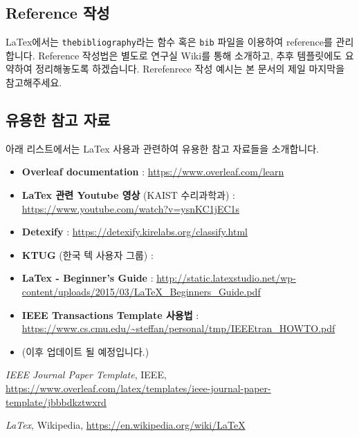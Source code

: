 \documentclass[journal]{IEEEtran}
\begin{document}
	\subsection{Reference 작성}
	
	LaTex에서는 {\tt thebibliography}라는 함수 혹은 {\tt bib} 파일을 이용하여 reference를 관리합니다. 
	Reference 작성법은 별도로 연구실 Wiki를 통해 소개하고, 추후 템플릿에도 요약하여 정리해놓도록 하겠습니다. 
	Rerefenrece 작성 예시는 본 문서의 제일 마지막을 참고해주세요. 
	
	\subsection{유용한 참고 자료}
	
	아래 리스트에서는 LaTex 사용과 관련하여 유용한 참고 자료들을 소개합니다. 
	\begin{itemize}
		\item {\bf Overleaf documentation} : \url{https://www.overleaf.com/learn}
		\item {\bf LaTex 관련 Youtube 영상} (KAIST 수리과학과) : {\url{https://www.youtube.com/watch?v=ysnKC1jEC1s}}
		\item {\bf Detexify} : \url{https://detexify.kirelabs.org/classify.html}
		\item {\bf KTUG} (한국 텍 사용자 그룹) : 
		\item {\bf LaTex - Beginner's Guide} : {\url{http://static.latexstudio.net/wp-content/uploads/2015/03/LaTeX_Beginners_Guide.pdf}}
		\item {\bf IEEE Transactions Template 사용법 }: \url{https://www.cs.cmu.edu/~steffan/personal/tmp/IEEEtran_HOWTO.pdf}
		\item (이후 업데이트 될 예정입니다.)
	\end{itemize}
	
	
	
	\appendices
	
	\begin{thebibliography}{1}
		
		\emph{IEEE Journal Paper Template}, IEEE, \url{https://www.overleaf.com/latex/templates/ieee-journal-paper-template/jbbbdkztwxrd}
		
		\emph{LaTex}, Wikipedia, \url{https://en.wikipedia.org/wiki/LaTeX}
		
	\end{thebibliography}
	
\end{document}
